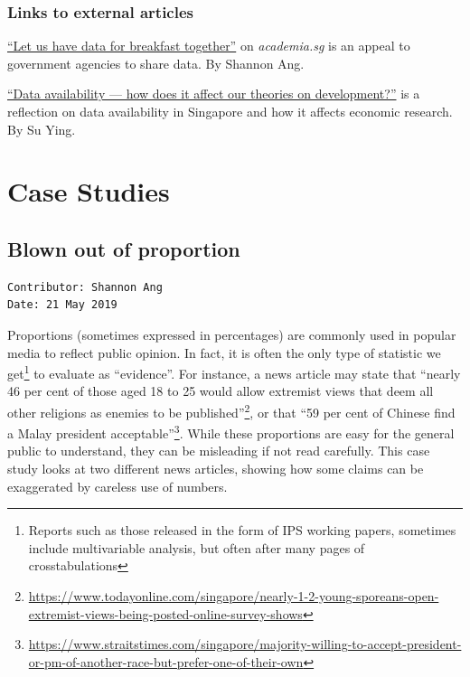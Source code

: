 \documentclass[
  openany]{book}
\begin{document}
\hypertarget{links-to-external-articles}{%
\section{Links to external articles}\label{links-to-external-articles}}

\href{https://www.academia.sg/academic-views/let-us-have-data-for-breakfast-together/}{``Let us have data for breakfast together''} on \emph{academia.sg} is an appeal to government agencies to share data. By Shannon Ang.

\href{https://aplannedcity.wordpress.com/2020/10/26/data-availability-how-does-it-affect-our-theories-on-development/}{``Data availability --- how does it affect our theories on development?''} is a reflection on data availability in Singapore and how it affects economic research. By Su Ying.

\hypertarget{part-case-studies}{%
\part{Case Studies}\label{part-case-studies}}

\hypertarget{oop}{%
\chapter{Blown out of proportion}\label{oop}}

\begin{verbatim}
Contributor: Shannon Ang
Date: 21 May 2019
\end{verbatim}

Proportions (sometimes expressed in percentages) are commonly used in popular media to reflect public opinion. In fact, it is often the only type of statistic we get\footnote{Reports such as those released in the form of IPS working papers, sometimes include multivariable analysis, but often after many pages of crosstabulations} to evaluate as ``evidence''. For instance, a news article may state that ``nearly 46 per cent of those aged 18 to 25 would allow extremist views that deem all other religions as enemies to be published''\footnote{\url{https://www.todayonline.com/singapore/nearly-1-2-young-sporeans-open-extremist-views-being-posted-online-survey-shows}}, or that ``59 per cent of Chinese find a Malay president acceptable''\footnote{\url{https://www.straitstimes.com/singapore/majority-willing-to-accept-president-or-pm-of-another-race-but-prefer-one-of-their-own}}. While these proportions are easy for the general public to understand, they can be misleading if not read carefully. This case study looks at two different news articles, showing how some claims can be exaggerated by careless use of numbers.
\end{document}
